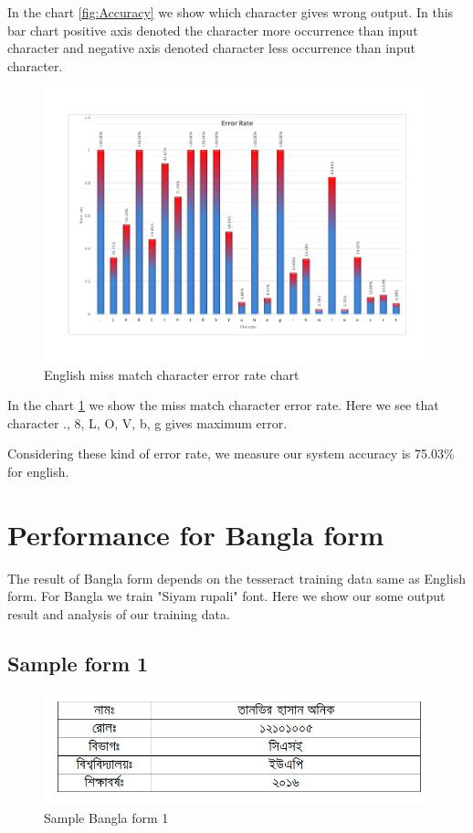 In the chart \ref{fig:Accuracy} we show which character gives wrong output. In this bar chart positive axis denoted the character more occurrence than input character and negative axis denoted character less occurrence than input character.

\begin{figure}[H]
\centering
\includegraphics[width=1\textwidth]{EError.pdf}
\caption {English miss match character error rate chart}
\label {fig:Eerror}
\end{figure}

In the chart \ref{fig:Eerror} we show the miss match character error rate. Here we see that character ., 8, L, O, V, b, g gives maximum error.

Considering these kind of error rate, we measure our system accuracy is 75.03\% for english.
\newpage

\section{Performance for Bangla form}
The result of Bangla form depends on the tesseract training data same as English form. For Bangla we train "Siyam rupali" font. Here we show our some output result and analysis of our training data.
\subsection{Sample form 1}
\begin{figure}[H]
\centering
\includegraphics[width=1\textwidth]{formBen01.JPG}
\caption {Sample Bangla form 1}
\label {fig:FormBan1}
\end{figure}

